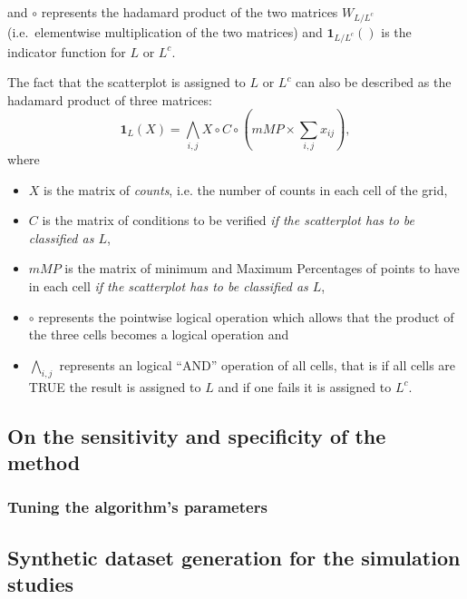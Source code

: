 \documentclass[10pt,letterpaper]{article}
\begin{document}
and \(\circ\) represents the hadamard product of the two matrices
\(W_{L/L^c}\) (i.e.~elementwise multiplication of the two matrices) and
\(\mathbf{1}_{L/L^c}()\) is the indicator function for \(L\) or \(L^c\).

The fact that the scatterplot is assigned to \(L\) or \(L^c\) can also
be described as the hadamard product of three matrices: \begin{equation}
\mathbf{1}_L(X) = \bigwedge_{i,j} X \circ C \circ \left( mMP \times \sum_{i,j}x_{ij}\right),
\end{equation} where

\begin{itemize}
\item ${X}$ is the matrix of \emph{counts}, i.e. the number of counts in each cell of the grid,
\item $C$ is the matrix of conditions to be verified \emph{if the scatterplot has to be classified as $L$},
\item $mMP$ is the matrix of minimum and Maximum Percentages of points to have in each cell \emph{if the scatterplot has to be classified as $L$},
\item $\circ$ represents the pointwise logical operation which allows that the product of the three cells becomes a logical operation and
\item $\bigwedge_{i,j}$ represents an logical ``AND'' operation of all cells, that is if all cells are TRUE the result is assigned to $L$ and if one fails it is assigned to $L^c$.
\end{itemize}

\hypertarget{on-the-sensitivity-and-specificity-of-the-method}{%
\subsection{On the sensitivity and specificity of the
method}\label{on-the-sensitivity-and-specificity-of-the-method}}

\hypertarget{tuning-the-algorithms-parameters}{%
\subsubsection{Tuning the algorithm's
parameters}\label{tuning-the-algorithms-parameters}}

\hypertarget{synthetic-dataset-generation-for-the-simulation-studies}{%
\subsection{Synthetic dataset generation for the simulation
studies}\label{synthetic-dataset-generation-for-the-simulation-studies}}
\end{document}
